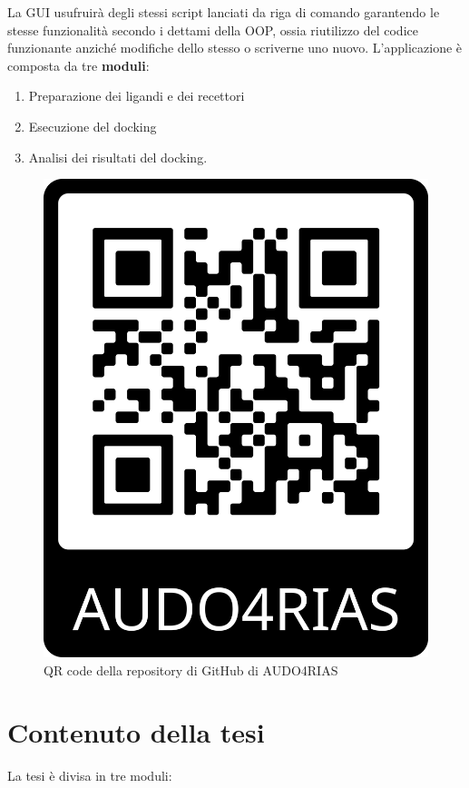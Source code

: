 La GUI usufruirà degli stessi script lanciati da riga di comando garantendo le stesse funzionalità secondo i dettami della OOP, ossia riutilizzo del codice funzionante anziché modifiche dello stesso o scriverne uno nuovo.\newline
L’applicazione è composta da tre \textbf{moduli}:

\begin{enumerate}
    \item Preparazione dei ligandi e dei recettori
    \item Esecuzione del docking
    \item Analisi dei risultati del docking.
\end{enumerate}

\begin{figure}[H]
    \centering
    \includegraphics[scale=0.1]{immagini/capitolo1/QRcode.png}
    \caption{QR code della repository di GitHub di AUDO4RIAS}
    \label{fig:QR code}
\end{figure}

\section{Contenuto della tesi}
La tesi è divisa in tre moduli:

